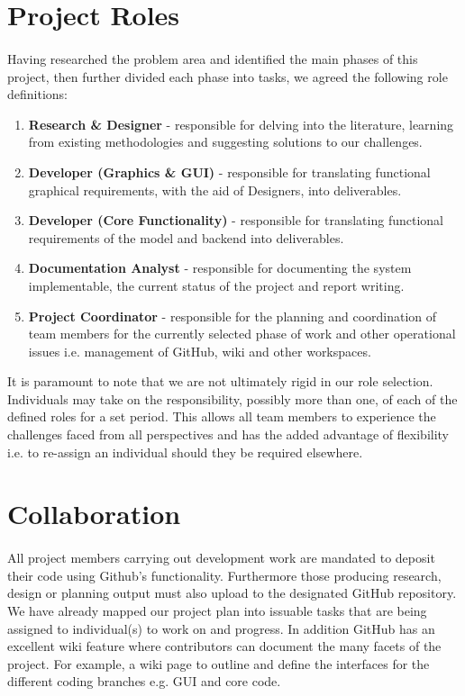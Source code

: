 \documentclass[11pt,a4paper]{article}
\begin{document}
\section{Project Roles}
\paragraph{}
Having researched the problem area and identified the main phases of this project, then further divided each phase into tasks, we agreed the following role definitions:

\begin{enumerate}
  \item \textbf{Research \& Designer} - responsible for delving into the literature, learning from existing methodologies and suggesting solutions to our challenges.
  \item \textbf{Developer (Graphics \& GUI)} - responsible for translating functional graphical requirements, with the aid of Designers, into deliverables.
  \item \textbf{Developer (Core Functionality)} - responsible for translating functional requirements of the model and backend into deliverables.
  \item \textbf{Documentation Analyst} - responsible for documenting the system implementable, the current status of the project and report writing.
  \item \textbf{Project Coordinator} - responsible for the planning and coordination of team members for the currently selected phase of work and other operational issues i.e. management of GitHub, wiki and other workspaces.
\end{enumerate}

It is paramount to note that we are not ultimately rigid in our role selection.  Individuals may take on the responsibility, possibly more than one, of each of the defined roles for a set period.  This allows all team members to experience the challenges faced from all perspectives and has the added advantage of flexibility i.e. to re-assign an individual should they be required elsewhere.

\section{Collaboration}
\paragraph{}
All project members carrying out development work are mandated to deposit their code using Github’s functionality.  Furthermore those producing research, design or planning output must also upload to the designated GitHub repository.  We have already mapped our project plan into issuable tasks that are being assigned to individual(s) to work on and progress.  In addition GitHub has an excellent wiki feature where contributors can document the many facets of the project.  For example, a wiki page to outline and define the interfaces for the different coding branches e.g. GUI and core code.
\end{document}
